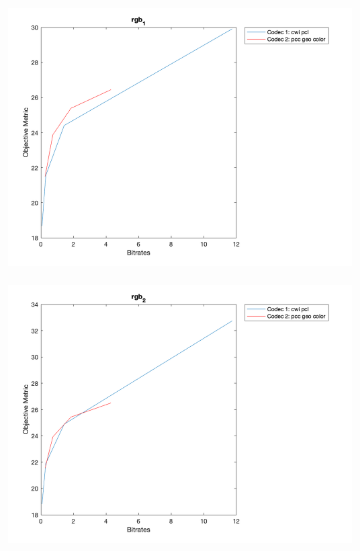 \documentclass{article}
\begin{document}
\begin{figure}
 \ContinuedFloat
    
    \begin{subfigure}[b]{0.65\textwidth}
    \includegraphics[width=\textwidth]{Figures/task2/longdress_rgb1.png}
    \end{subfigure}

    \begin{subfigure}[b]{0.65\textwidth}
    \includegraphics[width=\textwidth]{Figures/task2/longdress_rgb2.png}
    \end{subfigure}
    

\end{figure}
\end{document}
